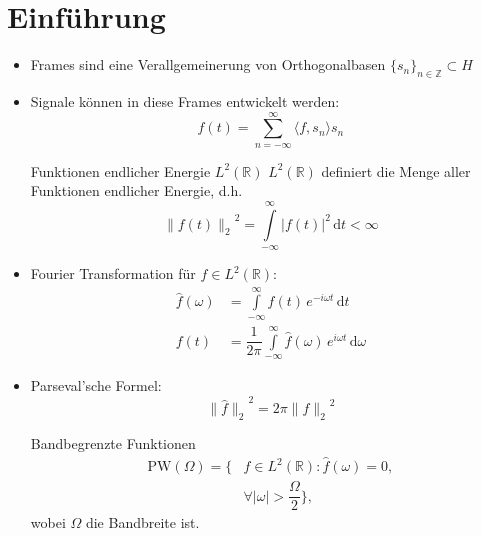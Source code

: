 		\section{Einführung}
        \begin{itemize}
                \item Frames sind eine Verallgemeinerung von Orthogonalbasen $\{s_{n}\}_{n \in \mathbb{Z}} \subset H$
          \item Signale können in diese Frames entwickelt werden:
                \begin{equation*}
                  f(t) = \sum\limits_{n=-\infty}^{\infty} \langle f, s_{n} \rangle s_{n}
                \end{equation*}
                \begin{definition}{Funktionen endlicher Energie $L^{2}(\mathbb{R})$}
                $L^{2}(\mathbb{R})$ definiert die Menge aller Funktionen endlicher Energie, d.h.\:
                \begin{equation*}
                  {\|f(t)\|_{2}}^{2} = \int\limits_{-\infty}^{\infty} |f(t)|^{2}\,\mathrm{d}t < \infty
                \end{equation*}
                \end{definition}
          \item Fourier Transformation für $f \in L^{2}(\mathbb{R})$:
                \begin{align*}
                  \hat{f}(\omega) &= \int\limits_{-\infty}^{\infty} f(t) \, e^{-i\omega t}\,\mathrm{d}t\\
                  f(t) &= \dfrac{1}{2\pi} \int\limits_{-\infty}^{\infty} \hat{f}(\omega) \, e^{i\omega t}\,\mathrm{d}\omega
                \end{align*}
          \item Parseval'sche Formel:
                \begin{equation*}
                  {\|\hat{f}\|_{2}}^{2} = 2\pi {\|f\|_{2}}^{2}
                \end{equation*}
                \begin{definition}{Bandbegrenzte Funktionen}
                  \begin{align*}
                    \mathrm{PW}(\Omega) = \{&f \in L^{2}(\mathbb{R}): \hat{f}(\omega) = 0,\\
                    &\forall|\omega| > \dfrac{\Omega}{2}\},
                  \end{align*}
                  wobei $\Omega$ die Bandbreite ist.
                \end{definition}

\end{itemize}
